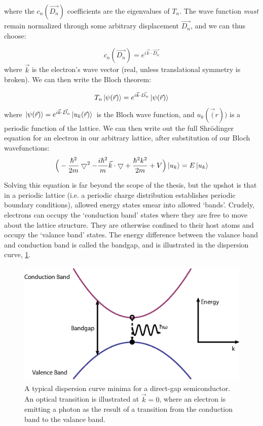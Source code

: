 where the $c_n(\vec{D_n})$ coefficients are the eigenvalues of $T_n$. The wave function \textit{must} remain normalized through some arbitrary displacement $\vec{D_n}$, and we can thus choose:

\begin{equation}
c_n(\vec{D_n}) = e^{i \vec{k} \cdot \vec{D_n}}
\end{equation}
where $\vec{k}$ is the electron's wave vector (real, unless translational symmetry is broken). We can then write the Bloch theorem:

\begin{equation}
T_n \ket{ \psi(\vec{r})} = e^{i\vec{k} \cdot \vec{D_n}} \ket{\psi(\vec{r})}
\end{equation}
where $\ket{\psi(\vec{r})} = e^{i\vec{k} \cdot \vec{D_n}}\ket{u_k(\vec{r})}$ is the Bloch wave function, and $u_k(\vec(r))$ is a periodic function of the lattice. We can then write out the full Shr\"{o}dinger equation for an electron in our arbitrary lattice, after substitution of our Bloch wavefunctions:
\begin{equation}
\Big (-\frac{ \hbar ^2}{2m} \bigtriangledown ^2 - \frac{ i\hbar^2}{m} \vec{k} \cdot \bigtriangledown + \frac{\hbar^2 k^2}{2m} + V \Big )\ket{u_k} = E \ket{u_k}
\end{equation}

\indent Solving this equation is far beyond the scope of the thesis, but the upshot is that in a periodic lattice (i.e. a periodic charge distribution establishes periodic boundary conditions), allowed energy states smear into allowed `bands'. Crudely, electrons can occupy the `conduction band' states where they are free to move about the lattice structure. They are otherwise confined to their host atoms and occupy the `valance band' states. The energy difference between the valance band and conduction band is called the bandgap, and is illustrated in the dispersion curve, \ref{Example band structure of a direct-gap semiconductor.}. 

\begin{figure}[h!]
\centering
\includegraphics[width = .8\textwidth]{dispcurve.eps}
\caption{A typical dispersion curve minima for a direct-gap semiconductor. An optical transition is illustrated at $\vec{k} = 0$, where an electron is emitting a photon as the result of a transition from the conduction band to the valance band.}
\label{Example band structure of a direct-gap semiconductor.}
\end{figure}

